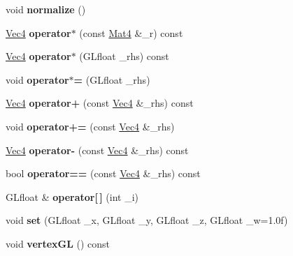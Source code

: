 \begin{DoxyCompactItemize}
\item 
void {\bfseries normalize} ()\hypertarget{classVec4_aecf9d5a3003c2a443098b4d80bc9dea6}{}\label{classVec4_aecf9d5a3003c2a443098b4d80bc9dea6}

\item 
\hyperlink{classVec4}{Vec4} {\bfseries operator$\ast$} (const \hyperlink{classMat4}{Mat4} \&\+\_\+r) const \hypertarget{classVec4_a878f420e799f587d908da586afd654c5}{}\label{classVec4_a878f420e799f587d908da586afd654c5}

\item 
\hyperlink{classVec4}{Vec4} {\bfseries operator$\ast$} (G\+Lfloat \+\_\+rhs) const \hypertarget{classVec4_ab3802d9f4dee81313994294ee6718c82}{}\label{classVec4_ab3802d9f4dee81313994294ee6718c82}

\item 
void {\bfseries operator$\ast$=} (G\+Lfloat \+\_\+rhs)\hypertarget{classVec4_ac0efcc6b09bc660cd42072a15b83b8bd}{}\label{classVec4_ac0efcc6b09bc660cd42072a15b83b8bd}

\item 
\hyperlink{classVec4}{Vec4} {\bfseries operator+} (const \hyperlink{classVec4}{Vec4} \&\+\_\+rhs) const \hypertarget{classVec4_a58014ec694674a8c27587a03037f0f09}{}\label{classVec4_a58014ec694674a8c27587a03037f0f09}

\item 
void {\bfseries operator+=} (const \hyperlink{classVec4}{Vec4} \&\+\_\+rhs)\hypertarget{classVec4_a9d7dbf4c6dc031cbed8a0d5938021821}{}\label{classVec4_a9d7dbf4c6dc031cbed8a0d5938021821}

\item 
\hyperlink{classVec4}{Vec4} {\bfseries operator-\/} (const \hyperlink{classVec4}{Vec4} \&\+\_\+rhs) const \hypertarget{classVec4_ae2579c5b5ce533033325ebd78bf3d544}{}\label{classVec4_ae2579c5b5ce533033325ebd78bf3d544}

\item 
bool {\bfseries operator==} (const \hyperlink{classVec4}{Vec4} \&\+\_\+rhs) const \hypertarget{classVec4_a179aabcc9171e5daeb9d95503ecf86af}{}\label{classVec4_a179aabcc9171e5daeb9d95503ecf86af}

\item 
G\+Lfloat \& {\bfseries operator\mbox{[}$\,$\mbox{]}} (int \+\_\+i)\hypertarget{classVec4_a0fde5c8772ebb5e0f833bd56f16d04f9}{}\label{classVec4_a0fde5c8772ebb5e0f833bd56f16d04f9}

\item 
void {\bfseries set} (G\+Lfloat \+\_\+x, G\+Lfloat \+\_\+y, G\+Lfloat \+\_\+z, G\+Lfloat \+\_\+w=1.\+0f)\hypertarget{classVec4_a63f1350537ea2b3fdf564627a4b23757}{}\label{classVec4_a63f1350537ea2b3fdf564627a4b23757}

\item 
void {\bfseries vertex\+GL} () const \hypertarget{classVec4_ae637ea15f081d10860629ec70f95929a}{}\label{classVec4_ae637ea15f081d10860629ec70f95929a}

\end{DoxyCompactItemize}
